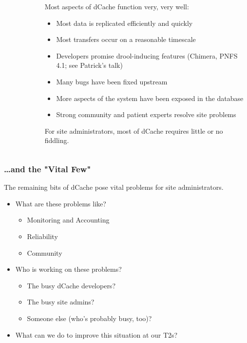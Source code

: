 \documentclass{beamer}
\begin{document}
\begin{frame}
\begin{columns}[t]
\begin{column}{.25\textwidth}
\begin{figure}
    \end{figure}
\end{column}
\begin{column}{.75\textwidth}
    \large{Most aspects of dCache function very, very well:}
    \begin{itemize}
        \item Most data is replicated efficiently and quickly
        \item Most transfers occur on a reasonable timescale
        \item Developers promise drool-inducing features (Chimera, PNFS 4.1; 
        see Patrick's talk)
        \item Many bugs have been fixed upstream
        \item More aspects of the system have been exposed in the database
        \item Strong community and patient experts resolve site problems
    \end{itemize}
    For site administrators, most of dCache requires little or no fiddling.
\end{column}
\end{columns}
\end{frame}

\begin{frame}
\frametitle{\dots{}and the "Vital Few"}
The remaining bits of dCache pose vital problems for site administrators.

\begin{itemize}
    \item What are these problems like?
    \begin{itemize}
        \item Monitoring and Accounting
        \item Reliability
        \item Community
    \end{itemize}
    \item Who is working on these problems?
    \begin{itemize}
        \item The busy dCache developers?
        \item The busy site admins?
        \item Someone else (who's probably busy, too)?
    \end{itemize}
    \item What can we do to improve this situation at our T2s?
\end{itemize}
\end{frame}
\end{document}
